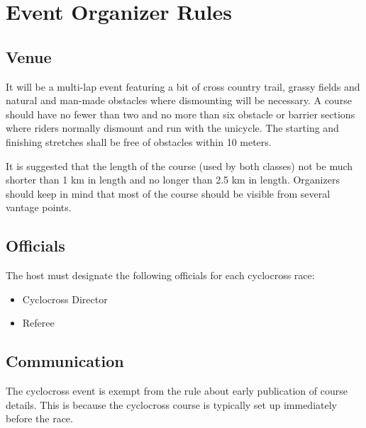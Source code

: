 \chapter{Event Organizer Rules}

\section{Venue}

It will be a multi-lap event featuring a bit of cross country trail, grassy fields and natural and man-made obstacles where dismounting will be necessary.
A course should have no fewer than two and no more than six obstacle or barrier sections where riders normally dismount and run with the unicycle.
The starting and finishing stretches shall be free of obstacles within 10 meters.

It is suggested that the length of the course (used by both classes) not be much shorter than 1 km in length and no longer than 2.5 km in length. 
Organizers should keep in mind that most of the course should be visible from several vantage points.

\section{Officials}

The host must designate the following officials for each cyclocross race:
\begin{itemize}
\item Cyclocross Director
\item Referee
\end{itemize}

\section{Communication}

\begin{comment-2016}
Some thoughts on what might need to be communicated:
\begin{itemize}
\item age groups
\item results
\end{itemize}
}
\end{comment-2016}

The cyclocross event is exempt from the rule about early publication of course details. This is because the cyclocross course is typically set up immediately before the race.

